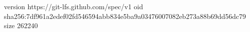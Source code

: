 version https://git-lfs.github.com/spec/v1
oid sha256:7df961a2edef02fd546594abb834e5ba9a03476007082eb273a88b69dd56dc79
size 262240
